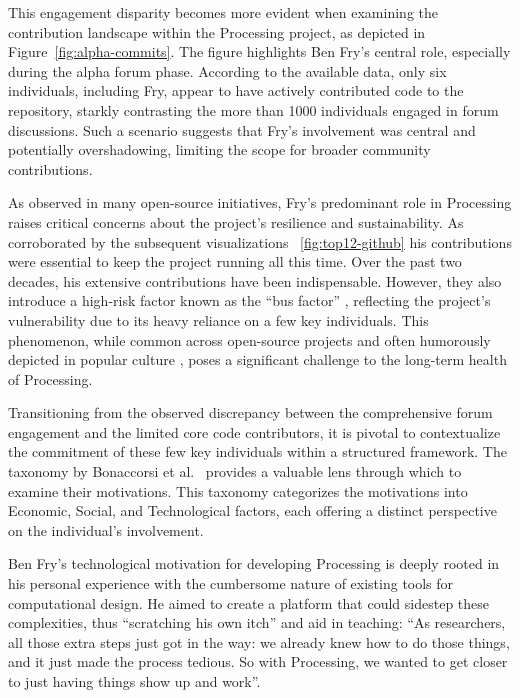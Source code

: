 This engagement disparity becomes more evident when examining the contribution landscape within the Processing project, as depicted in Figure~\ref{fig:alpha-commits}. The figure highlights Ben Fry’s central role, especially during the alpha forum phase. According to the available data, only six individuals, including Fry, appear to have actively contributed code to the repository, starkly contrasting the more than 1000 individuals engaged in forum discussions. Such a scenario suggests that Fry’s involvement was central and potentially overshadowing, limiting the scope for broader community contributions. 

As observed in many open-source initiatives, Fry’s predominant role in Processing raises critical concerns about the project’s resilience and sustainability. As corroborated by the subsequent visualizations ~\ref{fig:top12-github} his contributions were essential to keep the project running all this time. Over the past two decades, his extensive contributions have been indispensable. However, they also introduce a high-risk factor known as the \enquote{bus factor} \parencite{BusFactor2023}, reflecting the project’s vulnerability due to its heavy reliance on a few key individuals. This phenomenon, while common across open-source projects and often humorously depicted in popular culture \parencite{munroeDependency2020}, poses a significant challenge to the long-term health of Processing.



Transitioning from the observed discrepancy between the comprehensive forum engagement and the limited core code contributors, it is pivotal to contextualize the commitment of these few key individuals within a structured framework. The taxonomy by Bonaccorsi et al.~\cite{bonaccorsiComparingMotivationsIndividual2006} provides a valuable lens through which to examine their motivations. This taxonomy categorizes the motivations into Economic, Social, and Technological factors, each offering a distinct perspective on the individual’s involvement.

Ben Fry’s technological motivation for developing Processing is deeply rooted in his personal experience with the cumbersome nature of existing tools for computational design. He aimed to create a platform that could sidestep these complexities, thus \enquote{scratching his own itch} and aid in teaching: \enquote{As researchers, all those extra steps just got in the way: we already knew how to do those things, and it just made the process tedious. So with Processing, we wanted to get closer to just having things show up and work}. 

